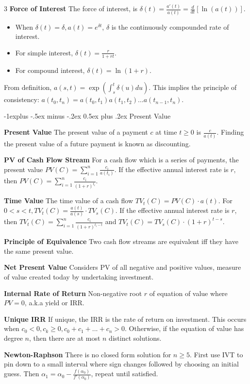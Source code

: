 \documentclass[10pt, landscape]{article}
\makeatletter
\renewcommand{\section}{\@startsection{section}{1}{0mm}%
                                {-1ex plus -.5ex minus -.2ex}%
                                {0.5ex plus .2ex}%
                                {\normalfont\large\bfseries}}
\renewcommand{\section}{\@startsection{section}{2}{0mm}%
                                {-1explus -.5ex minus -.2ex}%
                                {0.5ex plus .2ex}%
                                {\normalfont\normalsize\bfseries}}
\makeatother
\begin{document}
\begin{multicols*}{3}
\textbf{Force of Interest} The force of interest, is $\delta(t)=\frac{a'(t)}{a(t)}=\frac{d}{dt}[\ln(a(t))]$.
\begin{itemize}
    \item When $\delta(t)=\delta, a(t)=e^{\delta t}$, $\delta$ is the continuously compounded rate of interest.
    \item For simple interest, $\delta(t)=\frac{r}{1+rt}$.
    \item For compound interest, $\delta(t)=\ln(1+r)$.
\end{itemize}
From definition, $a(s,t)=\exp(\int_s^t\delta(u)du)$. This implies the principle of consistency: $a(t_0, t_n)=a(t_0, t_1)a(t_1,t_2)...a(t_{n-1},t_n)$.

\section{Present Value}

\textbf{Present Value} The present value of a payment $c$ at time $t \geq0$ is $\frac{c}{a(t)}$. Finding the present value of a future payment is known as discounting.

\textbf{PV of Cash Flow Stream} For a cash flow which is a series of payments, the present value $PV(C)=\sum_{i=1}^n\frac{c_i}{a(t_i)}$. If the effective annual interest rate is $r$, then $PV(C)=\sum_{i=1}^n\frac{c_i}{(1+r)^{t_i}}$.

\textbf{Time Value} The time value of a cash flow $TV_t(C)=PV(C) \cdot a(t)$. For $0<s<t, TV_t(C)=\frac{a(t)}{a(s)}\cdot TV_s(C)$. If the effective annual interest rate is $r$, then $TV_t(C)=\sum_{i=1}^n\frac{c_i}{(1+r)^{t_i-t}}$ and $TV_t(C)=TV_s(C)\cdot (1+r)^{t-s}$.

\textbf{Principle of Equivalence} Two cash flow streams are equivalent iff they have the same present value.

\textbf{Net Present Value} Considers PV of all negative and positive values, measure of value created today by undertaking investment.

\textbf{Internal Rate of Return} Non-negative root $r$ of equation of value where $PV=0$, a.k.a yield or IRR.

\textbf{Unique IRR} If unique, the IRR is the rate of return on investment. This occurs when $c_0 < 0, c_k \geq 0, c_0+c_1+...+c_n >0$. Otherwise, if the equation of value has degree $n$, then there are at most $n$ distinct solutions.

\textbf{Newton-Raphson} There is no closed form solution for $n\geq 5$. First use IVT to pin down to a small interval where sign changes followed by choosing an initial guess. Then $\alpha_1=\alpha_0-\frac{f(\alpha_0)}{f'(\alpha_0)}$, repeat until satisfied.


\end{multicols*}
\end{document}
